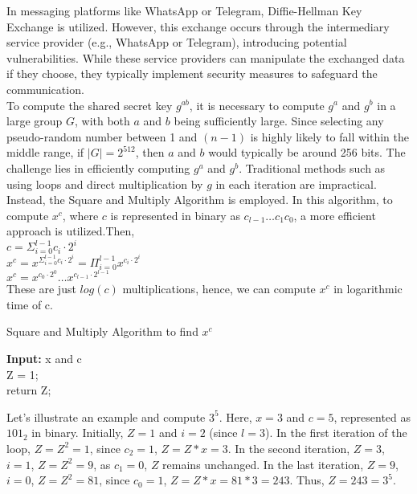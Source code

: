 \documentclass[11pt]{article}
\begin{document}
In messaging platforms like WhatsApp or Telegram, Diffie-Hellman Key Exchange is utilized. However, this exchange occurs through the intermediary service provider (e.g., WhatsApp or Telegram), introducing potential vulnerabilities. While these service providers can manipulate the exchanged data if they choose, they typically implement security measures to safeguard the communication.\\

To compute the shared secret key \( g^{ab} \), it is necessary to compute \( g^a \) and \( g^b \) in a large group \( G \), with both \( a \) and \( b \) being sufficiently large. Since selecting any pseudo-random number between 1 and \( (n-1) \) is highly likely to fall within the middle range, if \( |G| = 2^{512} \), then \( a \) and \( b \) would typically be around 256 bits. The challenge lies in efficiently computing \( g^a \) and \( g^b \). Traditional methods such as using loops and direct multiplication by \( g \) in each iteration are impractical. Instead, the Square and Multiply Algorithm is employed. In this algorithm, to compute \( x^c \), where \( c \) is represented in binary as \( c_{l-1} \ldots c_1c_0 \), a more efficient approach is utilized.Then, \\
 \vspace{3mm}
$c = \Sigma_{i = 0}^{l-1} c_i \cdot 2^i$\\
\vspace{3mm}
$x^c = x^{\Sigma_{i = 0}^{l-1} c_i \cdot 2^i} = \Pi_{i = 0}^{l-1} x^{c_i \cdot 2^i}$\\
\vspace{3mm}
$x^c = x^{c_0\cdot 2^0}\hdots x^{c_{l-1}\cdot 2^{l-1}}$\\
These are just $log(c)$ multiplications, hence, we can compute $x^c$ in logarithmic time of c.
\begin{center}
    \begin{algorithm}
    \caption{Square and Multiply Algorithm to find $x^c$}
        \textbf{Input:} x and c\\
        Z = 1;\\
        return Z;
    \end{algorithm}
\end{center}

Let's illustrate an example and compute \(3^5\). Here, \(x = 3\) and \(c = 5\), represented as \(101_2\) in binary. Initially, \(Z = 1\) and \(i = 2\) (since \(l = 3\)). In the first iteration of the loop, \(Z = Z^2 = 1\), since \(c_2 = 1\), \(Z = Z * x = 3\). In the second iteration, \(Z = 3\), \(i = 1\), \(Z = Z^2 = 9\), as \(c_1 = 0\), \(Z\) remains unchanged. In the last iteration, \(Z = 9\), \(i = 0\), \(Z = Z^2 = 81\), since \(c_0 = 1\), \(Z = Z * x = 81 * 3 = 243\). Thus, \(Z = 243 = 3^5\).
\end{document}
